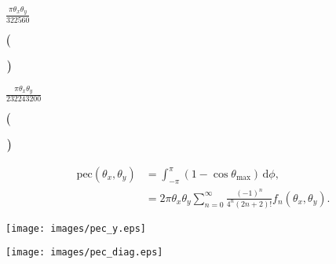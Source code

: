 \documentclass[a4paper,11pt,twoside,openright]{book}
\providecommand{\pec}{{\mathrm{pec}}}%
\def\lthtmlcheckvsize{\ifdim\ht\sizebox<\vsize 
  \ifdim\wd\sizebox<\hsize\expandafter\hfill\fi \expandafter\vfill
  \else\expandafter\vss\fi}%
\begin{document}
{\newpage\clearpage
{}%
$\displaystyle {\frac{{\pi \theta_x \theta_y }}{{322560}}}$%
\lthtmlindisplaymathZ
\lthtmlcheckvsize\clearpage}

{\newpage\clearpage
{}%
$\displaystyle \left(\vphantom{ 5\theta_x ^6 + 3\theta_x ^4\theta_y ^2 + 3\theta_x ^2\theta_y ^4 + 5\theta_y ^6 }\right.$%
\lthtmlindisplaymathZ
\lthtmlcheckvsize\clearpage}

{\newpage\clearpage
{}%
$\displaystyle \left.\vphantom{ 5\theta_x ^6 + 3\theta_x ^4\theta_y ^2 + 3\theta_x ^2\theta_y ^4 + 5\theta_y ^6 }\right)$%
\lthtmlindisplaymathZ
\lthtmlcheckvsize\clearpage}

{\newpage\clearpage
{}%
$\displaystyle {\frac{{\pi \theta_x \theta_y }}{{232243200}}}$%
\lthtmlindisplaymathZ
\lthtmlcheckvsize\clearpage}

{\newpage\clearpage
{}%
$\displaystyle \left(\vphantom{ 35\theta_x ^8 + 20\theta_x ^6\theta_y ^2 + 18\theta_x ^4\theta_y ^4 + 20x^2\theta_y ^6 + 35\theta_y ^8 }\right.$%
\lthtmlindisplaymathZ
\lthtmlcheckvsize\clearpage}

{\newpage\clearpage
{}%
$\displaystyle \left.\vphantom{ 35\theta_x ^8 + 20\theta_x ^6\theta_y ^2 + 18\theta_x ^4\theta_y ^4 + 20x^2\theta_y ^6 + 35\theta_y ^8 }\right)$%
\lthtmlindisplaymathZ
\lthtmlcheckvsize\clearpage}

{\newpage\clearpage
\setcounter{equation}{45}
%
\begin{subequations}\begin{align}
\pec (\theta_x , \theta_y )
&= \int_{-\pi}^{\pi} \left( 1 - \cos\theta_{\textrm{max}}\right) \,\mathrm{d}\phi , \\
&= 2\pi \theta_x \theta_y \sum_{n=0}^\infty \frac{(-1)^n}{4^n(2n+2)!} f_n(\theta_x , \theta_y ) .
\end{align}\end{subequations}%
\lthtmldisplayZ
\lthtmlcheckvsize\clearpage}

{\newpage\clearpage
{}%
\texttt{[image: images/pec\_y.eps]}%
\lthtmlpictureZ
\lthtmlcheckvsize\clearpage}

{\newpage\clearpage
{}%
\texttt{[image: images/pec\_diag.eps]}%
\lthtmlpictureZ
\lthtmlcheckvsize\clearpage}
\end{document}
